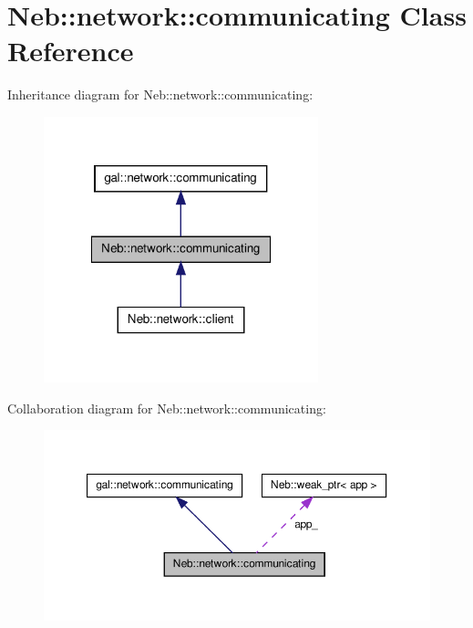 \hypertarget{classNeb_1_1network_1_1communicating}{\section{\-Neb\-:\-:network\-:\-:communicating \-Class \-Reference}
\label{classNeb_1_1network_1_1communicating}
}


\-Inheritance diagram for \-Neb\-:\-:network\-:\-:communicating\-:\nopagebreak
\begin{figure}[H]
\begin{center}
\leavevmode
\includegraphics[width=226pt]{classNeb_1_1network_1_1communicating__inherit__graph}
\end{center}
\end{figure}


\-Collaboration diagram for \-Neb\-:\-:network\-:\-:communicating\-:\nopagebreak
\begin{figure}[H]
\begin{center}
\leavevmode
\includegraphics[width=350pt]{classNeb_1_1network_1_1communicating__coll__graph}
\end{center}
\end{figure}
